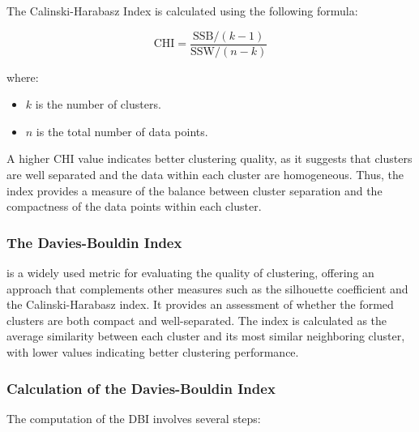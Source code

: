 \documentclass{llncs}
\begin{document}
The Calinski-Harabasz Index is calculated using the following formula:

\[
\text{CHI} = \frac{\text{SSB} / (k - 1)}{\text{SSW} / (n - k)}
\]

where:
\begin{itemize}
	\item $k$ is the number of clusters.
	\item $n$ is the total number of data points.
\end{itemize}

A higher CHI value indicates better clustering quality, as it suggests that clusters are well separated and the data within each cluster are homogeneous. Thus, the index provides a measure of the balance between cluster separation and the compactness of the data points within each cluster.\cite{Ning2023Clustering}

\subsubsection{The Davies-Bouldin Index}

 is a widely used metric for evaluating the quality of clustering, offering an approach that complements other measures such as the silhouette coefficient and the Calinski-Harabasz index. It provides an assessment of whether the formed clusters are both compact and well-separated. The index is calculated as the average similarity between each cluster and its most similar neighboring cluster, with lower values indicating better clustering performance.\cite{Davies1979Cluster}

\subsubsection*{Calculation of the Davies-Bouldin Index}

The computation of the DBI involves several steps:
\end{document}
